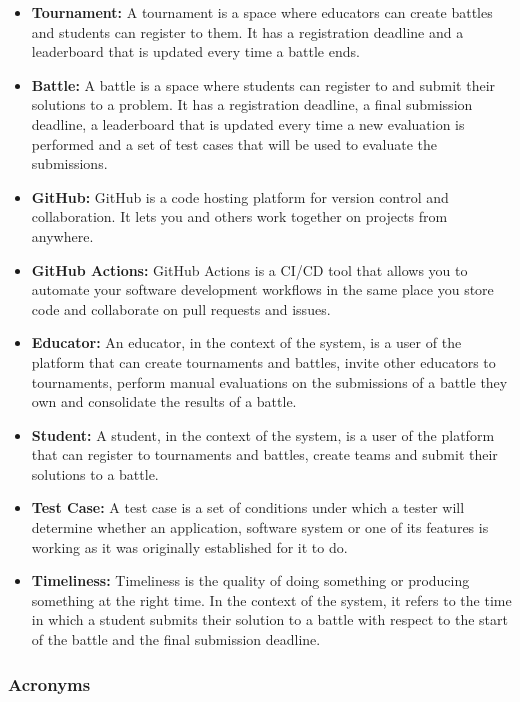 \documentclass{article}
\begin{document}
\begin{itemize}
    \item \textbf{Tournament:} A tournament is a space where educators can create battles and students can register to them. It has a registration deadline and a leaderboard that is updated every time a battle ends.
    \item \textbf{Battle:} A battle is a space where students can register to and submit their solutions to a problem. It has a registration deadline, a final submission deadline, a leaderboard that is updated every time a new evaluation is performed and a set of test cases that will be used to evaluate the submissions.
    \item \textbf{GitHub:} GitHub is a code hosting platform for version control and collaboration. It lets you and others work together on projects from anywhere.
    \item \textbf{GitHub Actions:} GitHub Actions is a CI/CD tool that allows you to automate your software development workflows in the same place you store code and collaborate on pull requests and issues.
    \item \textbf{Educator:} An educator, in the context of the system, is a user of the platform that can create tournaments and battles, invite other educators to tournaments, perform manual evaluations on the submissions of a battle they own and consolidate the results of a battle.
    \item \textbf{Student:} A student, in the context of the system, is a user of the platform that can register to tournaments and battles, create teams and submit their solutions to a battle.
    \item \textbf{Test Case:} A test case is a set of conditions under which a tester will determine whether an application, software system or one of its features is working as it was originally established for it to do.
    \item \textbf{Timeliness:} Timeliness is the quality of doing something or producing something at the right time. In the context of the system, it refers to the time in which a student submits their solution to a battle with respect to the start of the battle and the final submission deadline.
\end{itemize}

\subsubsection{Acronyms}
\end{document}
